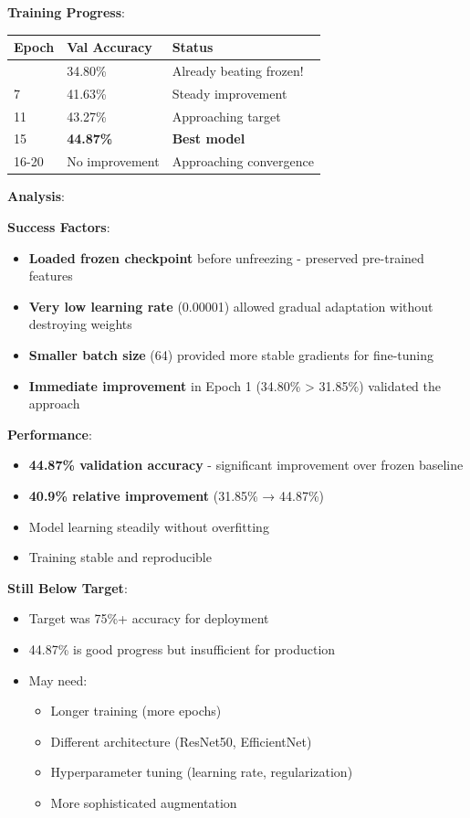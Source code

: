 \documentclass[
  letterpaper,
  DIV=11,
  numbers=noendperiod]{scrartcl}
\providecommand{\tightlist}{%
  \setlength{\itemsep}{0pt}\setlength{\parskip}{0pt}}
\begin{document}
\textbf{Training Progress}:

\begin{longtable}[]{@{}lll@{}}
\toprule\noalign{}
Epoch & Val Accuracy & Status \\
\midrule\noalign{}
\endhead
\bottomrule\noalign{}
\endlastfoot
1 & 34.80\% & Already beating frozen! \\
7 & 41.63\% & Steady improvement \\
11 & 43.27\% & Approaching target \\
15 & \textbf{44.87\%} & \textbf{Best model} \\
16-20 & No improvement & Approaching convergence \\
\end{longtable}

\textbf{Analysis}:

\textbf{Success Factors}:

\begin{itemize}
\tightlist
\item
  \textbf{Loaded frozen checkpoint} before unfreezing - preserved
  pre-trained features
\item
  \textbf{Very low learning rate} (0.00001) allowed gradual adaptation
  without destroying weights
\item
  \textbf{Smaller batch size} (64) provided more stable gradients for
  fine-tuning
\item
  \textbf{Immediate improvement} in Epoch 1 (34.80\% \textgreater{}
  31.85\%) validated the approach
\end{itemize}

\textbf{Performance}:

\begin{itemize}
\tightlist
\item
  \textbf{44.87\% validation accuracy} - significant improvement over
  frozen baseline
\item
  \textbf{40.9\% relative improvement} (31.85\% → 44.87\%)
\item
  Model learning steadily without overfitting
\item
  Training stable and reproducible
\end{itemize}

\textbf{Still Below Target}:

\begin{itemize}
\tightlist
\item
  Target was 75\%+ accuracy for deployment
\item
  44.87\% is good progress but insufficient for production
\item
  May need:

  \begin{itemize}
  \tightlist
  \item
    Longer training (more epochs)
  \item
    Different architecture (ResNet50, EfficientNet)
  \item
    Hyperparameter tuning (learning rate, regularization)
  \item
    More sophisticated augmentation
  \end{itemize}
\end{itemize}
\end{document}
